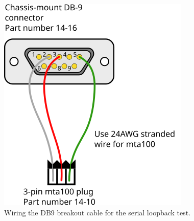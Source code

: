 \begin{figure}[ht]
  \begin{center}
    \includegraphics[clip,scale=1]{figs/usb_board_uart_to_db9}
    \caption{Wiring the DB9 breakout cable for the serial loopback
      test.\label{fig:db9_breakout}}
  \end{center}
\end{figure}

